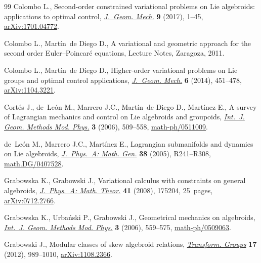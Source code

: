\documentclass[pdftex]{sigma}
\numberwithin{equation}{section}
\theoremstyle{definition}
\begin{document}
\begin{thebibliography}{99}
Colombo L., Second-order constrained variational problems on {L}ie algebroids:
 applications to optimal control, \href{https://doi.org/10.3934/jgm.2017001}{\textit{J.~Geom. Mech.}} \textbf{9} (2017),
 1--45, \href{https://arxiv.org/abs/1701.04772}{arXiv:1701.04772}.

Colombo L., Mart\'{i}n~de Diego D., A variational and geometric approach for
 the second order {E}uler--{P}oincar\'{e} equations, {L}ecture {N}otes,
 Zaragoza, 2011.

Colombo L., Mart\'{i}n~de Diego D., Higher-order variational problems on {L}ie
 groups and optimal control applications, \href{https://doi.org/10.3934/jgm.2014.6.451}{\textit{J.~Geom. Mech.}} \textbf{6}
 (2014), 451--478, \href{https://arxiv.org/abs/1104.3221}{arXiv:1104.3221}.

Cort\'{e}s J., de~Le\'{o}n M., Marrero J.C., Mart\'{i}n~de Diego D.,
 Mart\'{i}nez E., A survey of {L}agrangian mecha\-nics and control on {L}ie
 algebroids and groupoids, \href{https://doi.org/10.1142/S0219887806001211}{\textit{Int.~J. Geom. Methods Mod. Phys.}}
 \textbf{3} (2006), 509--558, \mbox{\href{https://arxiv.org/abs/math-ph/0511009}{math-ph/0511009}}.

de~Le\'{o}n M., Marrero J.C., Mart\'{i}nez E., Lagrangian submanifolds and
 dynamics on {L}ie algebroids, \href{https://doi.org/10.1088/0305-4470/38/24/R01}{\textit{J.~Phys.~A: Math. Gen.}} \textbf{38}
 (2005), R241--R308, \href{https://arxiv.org/abs/math.DG/0407528}{math.DG/0407528}.

Grabowska K., Grabowski J., Variational calculus with constraints on general
 algebroids, \href{https://doi.org/10.1088/1751-8113/41/17/175204}{\textit{J.~Phys.~A: Math. Theor.}} \textbf{41} (2008), 175204,
 25~pages, \href{https://arxiv.org/abs/0712.2766}{arXiv:0712.2766}.

Grabowska K., Urba\'{n}ski P., Grabowski J., Geometrical mechanics on
 algebroids, \href{https://doi.org/10.1142/S0219887806001259}{\textit{Int.~J. Geom. Methods Mod. Phys.}} \textbf{3} (2006),
 559--575, \href{https://arxiv.org/abs/math-ph/0509063}{math-ph/0509063}.

Grabowski J., Modular classes of skew algebroid relations, \href{https://doi.org/10.1007/s00031-012-9197-2}{\textit{Transform.
 Groups}} \textbf{17} (2012), 989--1010, \href{https://arxiv.org/abs/1108.2366}{arXiv:1108.2366}.


\end{thebibliography}
\end{document}
